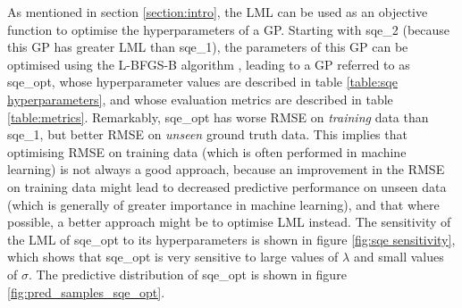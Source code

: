 As mentioned in section \ref{section:intro}, the LML can be used as an objective function to optimise the hyperparameters of a GP. Starting with sqe\_2 (because this GP has greater LML than sqe\_1), the parameters of this GP can be optimised using the L-BFGS-B algorithm \cite{wright1999numerical}, leading to a GP referred to as sqe\_opt, whose hyperparameter values are described in table \ref{table:sqe hyperparameters}, and whose evaluation metrics are described in table \ref{table:metrics}. Remarkably, sqe\_opt has worse RMSE on \emph{training} data than sqe\_1, but better RMSE on \emph{unseen} ground truth data. This implies that optimising RMSE on training data (which is often performed in machine learning) is not always a good approach, because an improvement in the RMSE on training data might lead to decreased predictive performance on unseen data (which is generally of greater importance in machine learning), and that where possible, a better approach might be to optimise LML instead. The sensitivity of the LML of sqe\_opt to its hyperparameters is shown in figure \ref{fig:sqe sensitivity}, which shows that sqe\_opt is very sensitive to large values of $\lambda$ and small values of $\sigma$. The predictive distribution of sqe\_opt is shown in figure \ref{fig:pred_samples_sqe_opt}.
